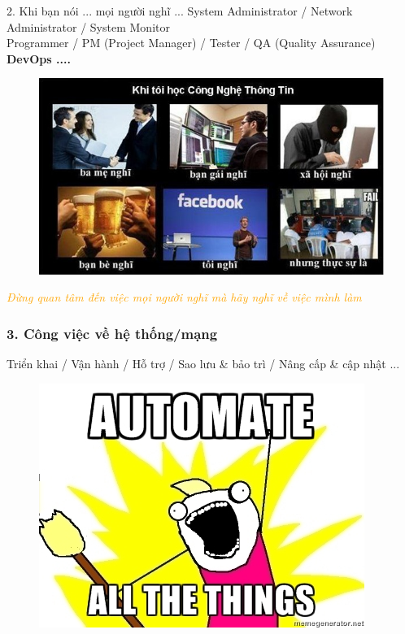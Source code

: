 \documentclass[10pt]{beamer}
\begin{document}
\label{Khi toi noi}
\begin{frame}{2. Khi bạn nói ... mọi người nghĩ ...}
\large{System Administrator / Network Administrator / System Monitor \\
Programmer / PM (Project Manager) / Tester / QA (Quality Assurance)  \\
\textbf{DevOps ....}} \\ 
\framebreak
\pause
\begin{figure}[!ht]
\centering
			\includegraphics[scale=0.5]{khibannoi}
\end{figure}
\pause
\textcolor{orange}{\textit{Đừng quan tâm đến việc mọi người nghĩ mà hãy nghĩ về việc mình làm}}
\end{frame}
\label{Python & Cong viec}
\begin{frame}
\frametitle{3. Công việc về hệ thống/mạng}
\pause Triển khai \pause / Vận hành \pause / Hỗ trợ \pause / Sao lưu \& bảo trì \pause / Nâng cấp \& cập nhật ...\\
\pause
{}
\label{Chu y tai lieu commnent}
\framebreak
\pause
\begin{figure}[!ht]
\centering
			\includegraphics[scale=0.5]{automate-all-the-things}
\end{figure}
\end{frame}
\end{document}
